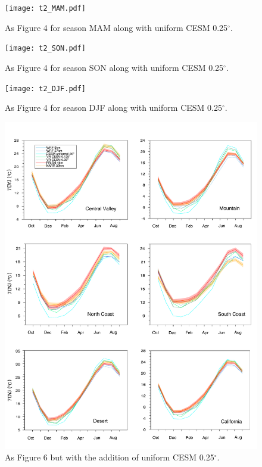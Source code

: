 \documentclass[draft,ms]{agutexSI}
\begin{document}
\begin{figure}
\begin{center}
\texttt{[image: t2\_MAM.pdf]}
\caption{As Figure 4 for season MAM along with uniform CESM 0.25$^\circ$.}
\end{center}
\end{figure}

\begin{figure}
\begin{center}
\texttt{[image: t2\_SON.pdf]}
\caption{As Figure 4 for season SON along with uniform CESM 0.25$^\circ$.}
\end{center}
\end{figure}

\begin{figure}
\begin{center}
\texttt{[image: t2\_DJF.pdf]}
\caption{As Figure 4 for season DJF along with uniform CESM 0.25$^\circ$.}
\end{center}
\end{figure}

\begin{figure}
\begin{center}
\includegraphics[width=6in]{trd_t2avg_allzones_with_uniform_CESM.pdf}
\caption{As Figure 6 but with the addition of uniform CESM 0.25$^\circ$.}
\end{center}
\end{figure}
\end{document}
